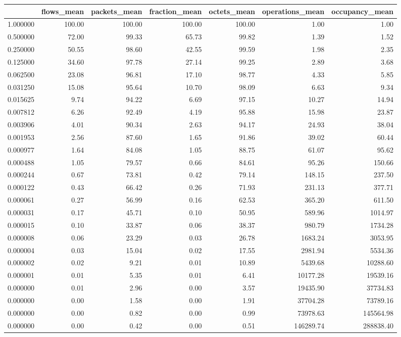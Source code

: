 \begin{tabular}{lrrrrrr}
\toprule
 & flows_mean & packets_mean & fraction_mean & octets_mean & operations_mean & occupancy_mean \\
\midrule
1.000000 & 100.00 & 100.00 & 100.00 & 100.00 & 1.00 & 1.00 \\
0.500000 & 72.00 & 99.33 & 65.73 & 99.82 & 1.39 & 1.52 \\
0.250000 & 50.55 & 98.60 & 42.55 & 99.59 & 1.98 & 2.35 \\
0.125000 & 34.60 & 97.78 & 27.14 & 99.25 & 2.89 & 3.68 \\
0.062500 & 23.08 & 96.81 & 17.10 & 98.77 & 4.33 & 5.85 \\
0.031250 & 15.08 & 95.64 & 10.70 & 98.09 & 6.63 & 9.34 \\
0.015625 & 9.74 & 94.22 & 6.69 & 97.15 & 10.27 & 14.94 \\
0.007812 & 6.26 & 92.49 & 4.19 & 95.88 & 15.98 & 23.87 \\
0.003906 & 4.01 & 90.34 & 2.63 & 94.17 & 24.93 & 38.04 \\
0.001953 & 2.56 & 87.60 & 1.65 & 91.86 & 39.02 & 60.44 \\
0.000977 & 1.64 & 84.08 & 1.05 & 88.75 & 61.07 & 95.62 \\
0.000488 & 1.05 & 79.57 & 0.66 & 84.61 & 95.26 & 150.66 \\
0.000244 & 0.67 & 73.81 & 0.42 & 79.14 & 148.15 & 237.50 \\
0.000122 & 0.43 & 66.42 & 0.26 & 71.93 & 231.13 & 377.71 \\
0.000061 & 0.27 & 56.99 & 0.16 & 62.53 & 365.20 & 611.50 \\
0.000031 & 0.17 & 45.71 & 0.10 & 50.95 & 589.96 & 1014.97 \\
0.000015 & 0.10 & 33.87 & 0.06 & 38.37 & 980.79 & 1734.28 \\
0.000008 & 0.06 & 23.29 & 0.03 & 26.78 & 1683.24 & 3053.95 \\
0.000004 & 0.03 & 15.04 & 0.02 & 17.55 & 2981.94 & 5534.36 \\
0.000002 & 0.02 & 9.21 & 0.01 & 10.89 & 5439.68 & 10288.60 \\
0.000001 & 0.01 & 5.35 & 0.01 & 6.41 & 10177.28 & 19539.16 \\
0.000000 & 0.01 & 2.96 & 0.00 & 3.57 & 19435.90 & 37734.83 \\
0.000000 & 0.00 & 1.58 & 0.00 & 1.91 & 37704.28 & 73789.16 \\
0.000000 & 0.00 & 0.82 & 0.00 & 0.99 & 73978.63 & 145564.98 \\
0.000000 & 0.00 & 0.42 & 0.00 & 0.51 & 146289.74 & 288838.40 \\
\bottomrule
\end{tabular}
